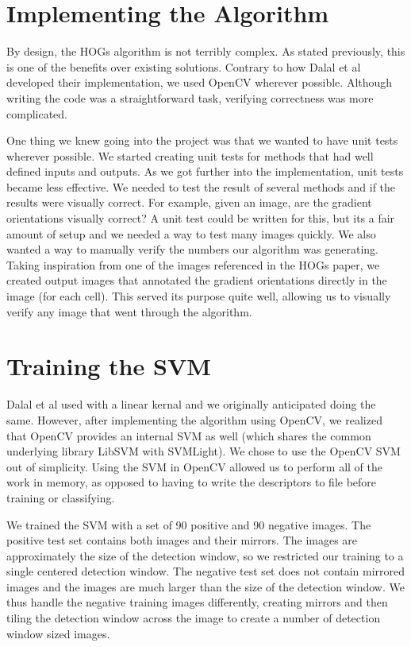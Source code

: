\documentclass[a4paper,11pt]{article}
\begin{document}
\begin{multicols}{2}
\section{Implementing the Algorithm}
By design, the HOGs algorithm is not terribly complex. As stated previously, this is one of the benefits 
over existing solutions. Contrary to how Dalal et al developed their implementation, we used 
OpenCV wherever possible. Although writing the code was a straightforward task, verifying correctness 
was more complicated.

One thing we knew going into the project was that we wanted to have unit tests wherever possible. We started 
creating unit tests for methods that had well defined inputs and outputs. As we got further into the 
implementation, unit tests became less effective. We needed to test the result of several methods and 
if the results were visually correct. For example, given an image, are the gradient orientations visually 
correct? A unit test could be written for this, but its a fair amount of setup and we needed a way to test 
many images quickly. We also wanted a way to manually verify the numbers our algorithm was generating. Taking 
inspiration from one of the images referenced in the HOGs paper, we created output images that annotated the 
gradient orientations directly in the image (for each cell). This served its purpose quite well, allowing 
us to visually verify any image that went through the algorithm.

\section{Training the SVM}
Dalal et al used with a linear kernal and we originally anticipated doing the same.
However, after implementing the algorithm using OpenCV, we realized that OpenCV provides an internal 
SVM as well (which shares the common underlying library LibSVM with SVMLight). We chose 
to use the OpenCV SVM out of simplicity.  Using the SVM in OpenCV allowed us to perform all of the 
work in memory, as opposed to having to write the descriptors to file before training or classifying.

We trained the SVM with a set of 90 positive and 90 negative images.  The positive test set contains 
both images and their mirrors. The images are approximately the size of the detection window, 
so we restricted our training to a single centered detection window. The negative test set does not 
contain mirrored images and the images are much larger than the size of the detection window.  
We thus handle the negative training images differently, creating mirrors and then tiling the 
detection window across the image to create a number of detection window sized images.


\end{multicols}
\end{document}
